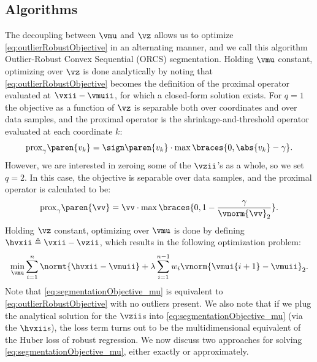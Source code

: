 \subsection{Algorithms}\label{sec:algorithms}
The decoupling between $\vmu$ and $\vz$ allows us to optimize
\eqref{eq:outlierRobustObjective} in an alternating manner, and we call this algorithm %
Outlier-Robust Convex Sequential (ORCS) segmentation.
Holding $\vmu$ constant, optimizing
over $\vz$ is done analytically by noting that
\eqref{eq:outlierRobustObjective} becomes the definition of the
proximal operator evaluated at $\vxii-\vmuii$, for which a closed-form solution exists.
For $q=1$ the objective as a function of $\vz$
is separable both over coordinates and over data samples, and the proximal
operator is the shrinkage-and-threshold operator evaluated at each
coordinate $k$:
\begin{equation*}%
    \mathrm{prox}_\gamma\paren{v_k}=\sign\paren{v_k}\cdot\max\braces{0,\abs{v_k}-\gamma}.
\end{equation*}
However, we are interested in zeroing some of the $\vzii$'s as a whole, so we set $q=2$. In this case, the objective is separable over data samples, and the proximal operator is calculated to be:
\begin{align}\label{eq:proxOp_l2}
\mathrm{prox}_{\gamma}\paren{\vv} = \vv\cdot\max\braces{0,1-\frac{\gamma}{\vnorm{\vv}_2}}.
\end{align}
Holding $\vz$ constant, optimizing over $\vmu$ is done by defining
$\hvxii\triangleq \vxii-\vzii$, which results in the following optimization problem:
\begin{equation}\label{eq:segmentationObjective_mu}
 \min_\vmu\sum_{i=1}^n\normt{\hvxii-\vmuii}  + \lambda\sum_{i=1}^{n-1}w_i\vnorm{\vmui{i+1}-\vmuii}_2.
\end{equation}
Note that \eqref{eq:segmentationObjective_mu} is equivalent to \eqref{eq:outlierRobustObjective} with no outliers present. We also note that if we plug the analytical solution for the $\vzii$s into \eqref{eq:segmentationObjective_mu} (via the $\hvxii$s), the loss term turns out to be the multidimensional equivalent of the Huber loss of robust regression.
We now discuss two approaches for solving \eqref{eq:segmentationObjective_mu}, either exactly or approximately.

